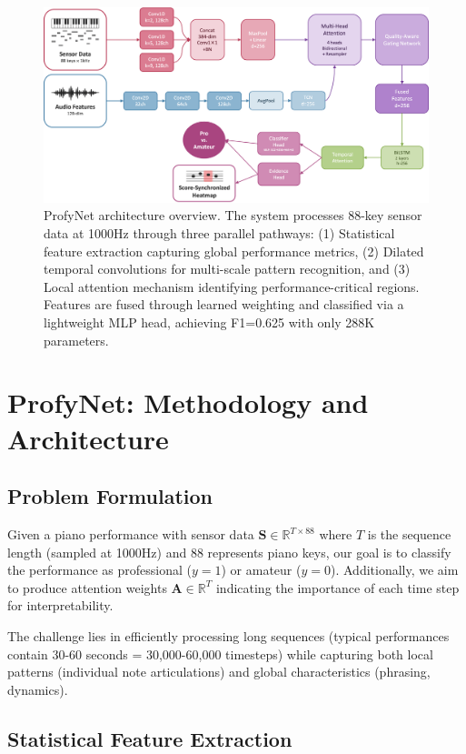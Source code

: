 \begin{figure}[h]
  \centering
  \includegraphics[width=0.8\linewidth]{figures/architecture_overview.png}
  \caption{ProfyNet architecture overview. The system processes 88-key sensor data at 1000Hz through three parallel pathways: (1) Statistical feature extraction capturing global performance metrics, (2) Dilated temporal convolutions for multi-scale pattern recognition, and (3) Local attention mechanism identifying performance-critical regions. Features are fused through learned weighting and classified via a lightweight MLP head, achieving F1=0.625 with only 288K parameters.}
  \Description{}
  \label{fig:architecture_overview}
\end{figure}

\section{ProfyNet: Methodology and Architecture}

\subsection{Problem Formulation}

Given a piano performance with sensor data $\mathbf{S} \in \mathbb{R}^{T \times 88}$ where $T$ is the sequence length (sampled at 1000Hz) and 88 represents piano keys, our goal is to classify the performance as professional ($y=1$) or amateur ($y=0$). Additionally, we aim to produce attention weights $\mathbf{A} \in \mathbb{R}^{T}$ indicating the importance of each time step for interpretability.

The challenge lies in efficiently processing long sequences (typical performances contain 30-60 seconds = 30,000-60,000 timesteps) while capturing both local patterns (individual note articulations) and global characteristics (phrasing, dynamics).

\subsection{Statistical Feature Extraction}

